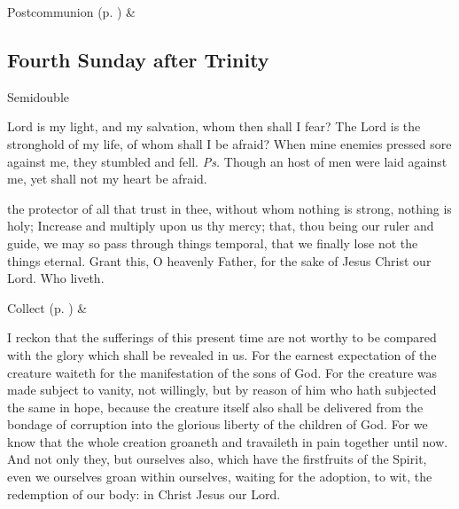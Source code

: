 \begin{rubric}
     Postcommunion  (p. \pageref{SPSaints}) \&  
\end{rubric}


\clearpage
\subsection{Fourth Sunday after Trinity}
\begin{inhead}
    {Semidouble}
\end{inhead}


\introit
{} Lord is my light, and my salvation, whom then shall I fear? The Lord is the stronghold of my life, of whom shall I be afraid? When mine enemies pressed sore against me, they stumbled and fell. \textit{Ps.} Though an host of men were laid against me, yet shall not my heart be afraid.

\collect
{} the protector of all that trust in thee, without whom nothing is strong, nothing is holy; Increase and multiply upon us thy mercy; that, thou being our ruler and guide, we may so pass through things temporal, that we finally lose not the things eternal. Grant this, O heavenly Father, for the sake of Jesus Christ our Lord. Who liveth.
\begin{rubric}
     Collect  (p. \pageref{SPSaints}) \&  
\end{rubric}

 I reckon that the sufferings of this present time are not worthy to be compared with the glory which shall be revealed in us. For the earnest expectation of the creature waiteth for the manifestation of the sons of God. For the creature was made subject to vanity, not willingly, but by reason of him who hath subjected the same in hope, because the creature itself also shall be delivered from the bondage of corruption into the glorious liberty of the children of God. For we know that the whole creation groaneth and travaileth in pain together until now. And not only they, but ourselves also, which have the firstfruits of the Spirit, even we ourselves groan within ourselves, waiting for the adoption, to wit, the redemption of our body: in Christ Jesus our Lord.


